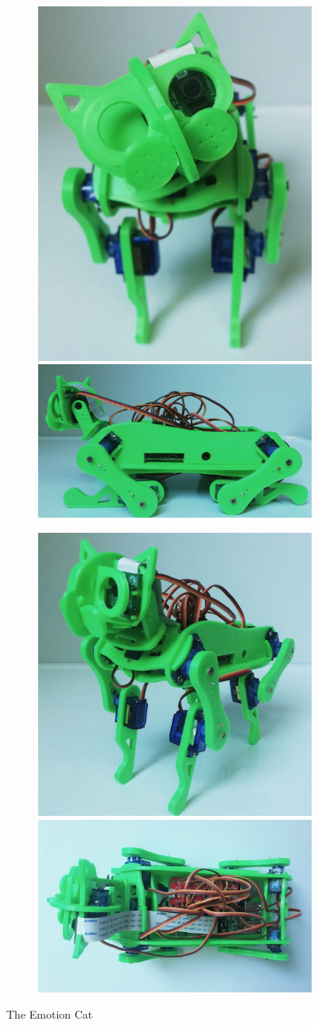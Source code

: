 \documentclass[runningheads,a4paper,12pt]{report}
\begin{document}
\begin{figure}
	\centering

  \begin{subfigure}{\linewidth}
  \includegraphics[width=.35\linewidth]{./images/cat_up}\hfill
  \includegraphics[width=.60\linewidth]{./images/cat_from_lateral}
  \end{subfigure}\par\medskip
  
  \begin{subfigure}{\linewidth}
  \includegraphics[width=.35\linewidth]{./images/cat_up_izometric}\hfill
  \includegraphics[width=.60\linewidth]{./images/cat_from_above}
  \end{subfigure}
    
    \caption{The Emotion Cat}  
    \label{fig:hardware-cat}
\end{figure} 
\end{document}
